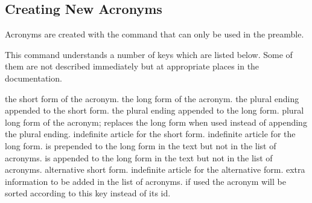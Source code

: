\documentclass[DIV10,toc=index,toc=bib,hyperfootnotes=false]{cnpkgdoc}
\makeatletter
\newcommand*\sinceversion[1]{%
  \@bsphack
  \marginnote{%
    \footnotesize\sffamily\RaggedRight
    \textcolor{black!75}{Introduced in version~#1}}%
  \@esphack}
\newcommand*\changedversion[1]{%
  \@bsphack
  \marginnote{%
    \footnotesize\sffamily\RaggedRight
    \textcolor{black!75}{Changed in version~#1}}%
  \@esphack}
\makeatother
\begin{document}
\subsection{Creating New Acronyms}
\noindent\changedversion{1.0}Acronyms are created with the command
 that can only be used in the preamble.
\begin{beschreibung}
\end{beschreibung}
This command understands a number of keys which are listed below. Some of them
are not described immediately but at appropriate places in the documentation.
\begin{beschreibung}
 \newline
   the short form of the acronym.
 \newline
   the long form of the acronym.
   the plural ending appended to the short form.
   the plural ending appended to the long form.
 \newline
   plural long form of the acronym; replaces the long form when used instead of
   appending the plural ending.
   \sinceversion{1.2}%
   indefinite article for the short form.
   \sinceversion{1.2}%
   indefinite article for the long form.
 \newline
   \sinceversion{1.1} is prepended to the long form in the text but
   not in the list of acronyms.
 \newline
   \sinceversion{1.1} is appended to the long form in the text but
   not in the list of acronyms.
 \newline
   alternative short form.
   \sinceversion{1.2}%
   indefinite article for the alternative form.
 \newline
   extra information to be added in the list of acronyms.
 \newline
   if used the acronym will be sorted according to this key instead of its \acs{id}.

\end{beschreibung}
\end{document}
